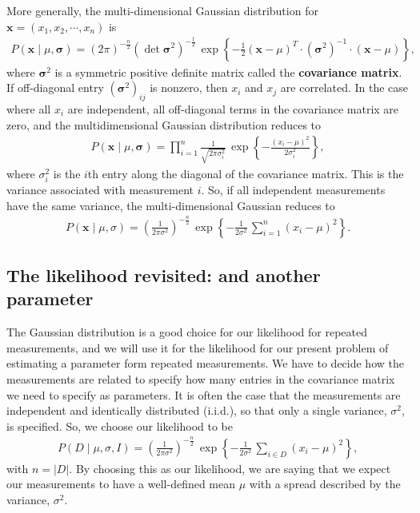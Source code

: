 More generally, the multi-dimensional Gaussian distribution for
$\mathbf{x} = (x_1, x_2, \cdots, x_n)$ is
\begin{align}
  P(\mathbf{x} \mid \mu, \boldsymbol{\sigma}) = (2\pi)^{-\frac{n}{2}} \left(\det \boldsymbol{\sigma}^2\right)^{-\frac{1}{2}}\,
  \exp\left\{-\frac{1}{2}(\mathbf{x} - \mu)^T\cdot (\boldsymbol{\sigma}^2)^{-1}\cdot(\mathbf{x} - \mu)\right\},
\end{align}
where $\boldsymbol{\sigma}^2$ is a symmetric positive definite matrix
called the \textbf{covariance matrix}.  If off-diagonal entry
$(\boldsymbol{\sigma}^2)_{ij}$ is nonzero, then $x_i$ and $x_j$ are
correlated.  In the case where all $x_i$ are independent, all
off-diagonal terms in the covariance matrix are zero, and the
multidimensional Gaussian distribution reduces to
\begin{align}
  P(\mathbf{x} \mid \mu, \boldsymbol{\sigma}) = \prod_{i=1}^n \frac{1}{\sqrt{2\pi \sigma_i^2}}\,
  \exp\left\{-\frac{(x_i - \mu)^2}{2\sigma_i^2}\right\},
\end{align}
where $\sigma^2_i$ is the $i$th entry along the diagonal of the
covariance matrix.  This is the variance associated with measurement
$i$.  So, if all independent measurements have the same variance, the
multi-dimensional Gaussian reduces to
\begin{align}
P(\mathbf{x} \mid \mu, \sigma) = \left(\frac{1}{2\pi \sigma^2} \right)^{-\frac{n}{2}}\,
  \exp\left\{-\frac{1}{2\sigma^2}\,\sum_{i=1}^n (x_i - \mu)^2\right\}.
\end{align}



\subsection{The likelihood revisited: and another parameter}
The Gaussian distribution is a good choice for our likelihood for
repeated measurements, and we will use it for the likelihood for our
present problem of estimating a parameter form repeated measurements.
We have to decide how the measurements are related to specify how many
entries in the covariance matrix we need to specify as parameters.  It
is often the case that the measurements are independent and identically
distributed (i.i.d.), so that only a single variance, $\sigma^2$, is
specified.  So, we choose our likelihood to be
\begin{align}
  P(D\mid \mu, \sigma, I) = \left(\frac{1}{2\pi \sigma^2} \right)^{-\frac{n}{2}}\,
  \exp\left\{-\frac{1}{2\sigma^2}\,\sum_{i\in D} (x_i - \mu)^2\right\},
\end{align}
with $n = |D|$.  By choosing this as our likelihood, we are saying
that we expect our measurements to have a well-defined mean $\mu$ with
a spread described by the variance, $\sigma^2$.


